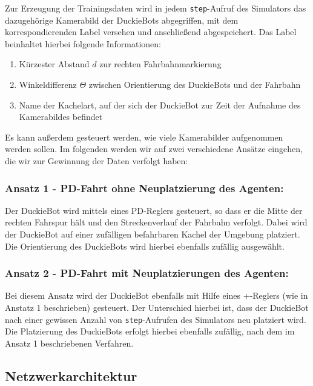 Zur Erzeugung der Trainingsdaten wird in jedem \texttt{step}-Aufruf des Simulators das dazugehörige Kamerabild der DuckieBots abgegriffen, mit dem korrespondierenden Label versehen und anschließend abgespeichert. Das Label beinhaltet hierbei folgende Informationen:

\begin{enumerate}
	\item Kürzester Abstand $d$ zur rechten Fahrbahnmarkierung
	\item Winkeldifferenz $\Theta$ zwischen Orientierung des DuckieBots und der Fahrbahn
	\item Name der Kachelart, auf der sich der DuckieBot zur Zeit der Aufnahme des Kamerabildes befindet
\end{enumerate}

Es kann außerdem gesteuert werden, wie viele Kamerabilder aufgenommen werden sollen.
Im folgenden werden wir auf zwei verschiedene Ansätze eingehen, die wir zur Gewinnung der Daten verfolgt haben:

\subsubsection{Ansatz 1 - PD-Fahrt ohne Neuplatzierung des Agenten:}

Der DuckieBot wird mittels eines PD-Reglers gesteuert, so dass er die Mitte der rechten Fahrspur hält und den Streckenverlauf der Fahrbahn verfolgt. Dabei wird der DuckieBot auf einer zufälligen befahrbaren Kachel der Umgebung platziert. Die Orientierung des DuckieBots  wird hierbei ebenfalls zufällig ausgewählt.

\subsubsection{Ansatz 2 - PD-Fahrt mit Neuplatzierungen des Agenten:}

Bei diesem Ansatz wird der DuckieBot ebenfalls mit Hilfe eines +-Reglers (wie in Anstatz 1 beschrieben) gesteuert. Der Unterschied hierbei ist, dass der DuckieBot nach einer gewissen Anzahl von \texttt{step}-Aufrufen des Simulators neu platziert wird. Die Platzierung des DuckieBots erfolgt hierbei ebenfalls zufällig, nach dem im Ansatz 1 beschriebenen Verfahren. 

\subsection{Netzwerkarchitektur}

